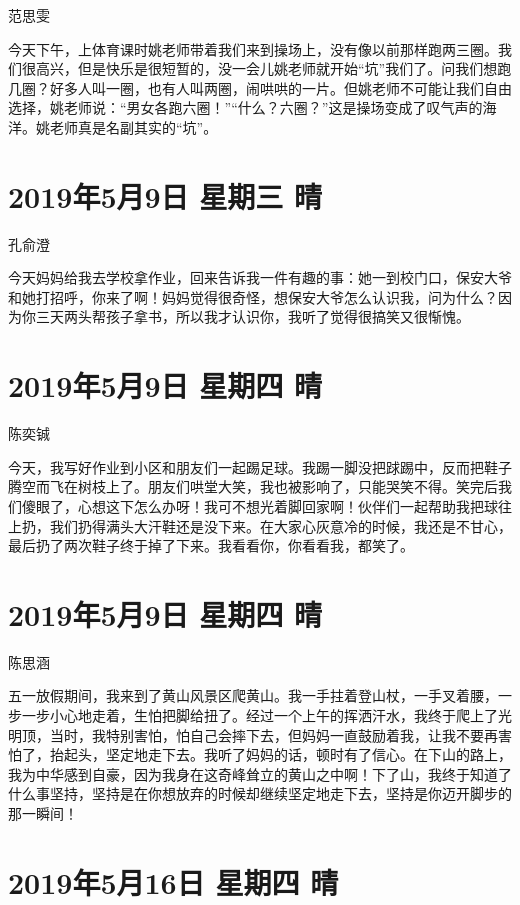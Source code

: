 范思雯

今天下午，上体育课时姚老师带着我们来到操场上，没有像以前那样跑两三圈。我们很高兴，但是快乐是很短暂的，没一会儿姚老师就开始``坑''我们了。问我们想跑几圈？好多人叫一圈，也有人叫两圈，闹哄哄的一片。但姚老师不可能让我们自由选择，姚老师说：``男女各跑六圈！''``什么？六圈？''这是操场变成了叹气声的海洋。姚老师真是名副其实的``坑''。

\section{2019年5月9日 星期三 晴}

孔俞澄

今天妈妈给我去学校拿作业，回来告诉我一件有趣的事：她一到校门口，保安大爷和她打招呼，你来了啊！妈妈觉得很奇怪，想保安大爷怎么认识我，问为什么？因为你三天两头帮孩子拿书，所以我才认识你，我听了觉得很搞笑又很惭愧。

\section{2019年5月9日 星期四 晴}

陈奕铖

今天，我写好作业到小区和朋友们一起踢足球。我踢一脚没把䟵踢中，反而把鞋子腾空而飞在树枝上了。朋友们哄堂大笑，我也被影响了，只能哭笑不得。笑完后我们傻眼了，心想这下怎么办呀！我可不想光着脚回家啊！伙伴们一起帮助我把球往上扔，我们扔得满头大汗鞋还是没下来。在大家心灰意冷的时候，我还是不甘心，最后扔了两次鞋子终于掉了下来。我看看你，你看看我，都笑了。

\section{2019年5月9日 星期四 晴}

陈思涵

五一放假期间，我来到了黄山风景区爬黄山。我一手拄着登山杖，一手叉着腰，一步一步小心地走着，生怕把脚给扭了。经过一个上午的挥洒汗水，我终于爬上了光明顶，当时，我特别害怕，怕自己会摔下去，但妈妈一直鼓励着我，让我不要再害怕了，抬起头，坚定地走下去。我听了妈妈的话，顿时有了信心。在下山的路上，我为中华感到自豪，因为我身在这奇峰耸立的黄山之中啊！下了山，我终于知道了什么事坚持，坚持是在你想放弃的时候却继续坚定地走下去，坚持是你迈开脚步的那一瞬间！

\section{2019年5月16日 星期四 晴}

